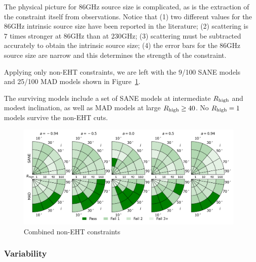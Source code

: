 The physical picture for 86GHz source size is complicated, as is the extraction of the constraint itself from observations.  Notice that (1) two different values for the 86GHz intrinsic source size have been reported in the literature; (2) scattering is $7$ times stronger at $86$GHz than at $230$GHz; (3) scattering must be subtracted accurately to obtain the intrinsic source size; (4) the error bars for the 86GHz source size are narrow and this determines the strength of the constraint.



Applying only non-EHT constraints, we are left with the 9/100 SANE models and 25/100 MAD models shown in Figure~\ref{fig:non_eht_cuts}.

The surviving models include a set of SANE models at intermediate $R_\mathrm{high}$ and modest inclination, as well as MAD models at large $R_\mathrm{high} \ge 40$. No $R_\mathrm{high} = 1$ models survive the non-EHT cuts.

\begin{figure}
  \centering
  \includegraphics[width=\textwidth]{./figures/Non_Interferometric_Constraints.png}
  \caption{Combined non-EHT constraints}
  \label{fig:non_eht_cuts}
\end{figure}

\subsubsection{Variability}

